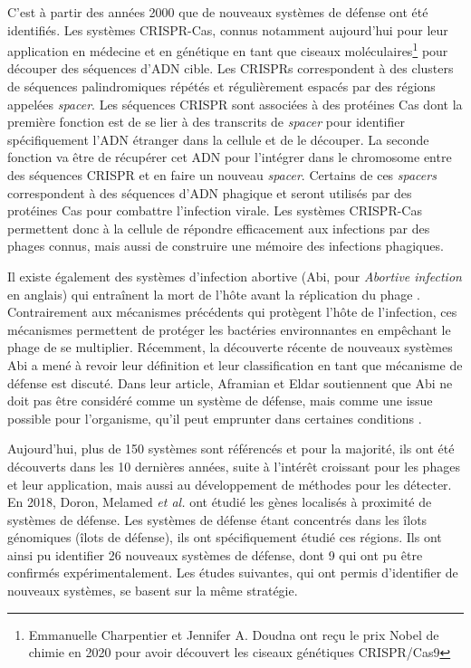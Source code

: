 C'est à partir des années 2000 que de nouveaux systèmes de défense ont été identifiés. Les systèmes CRISPR-Cas, connus notamment aujourd'hui pour leur application en médecine et en génétique en tant que ciseaux moléculaires\cite{haft_guild_2005,barrangou_crispr_2007}\footnote{Emmanuelle Charpentier et Jennifer A. Doudna ont reçu le prix Nobel de chimie en 2020 pour avoir découvert les ciseaux génétiques CRISPR/Cas9} pour découper des séquences d'ADN cible. Les CRISPRs correspondent à des clusters de séquences palindromiques répétés et régulièrement espacés par des régions appelées \textit{spacer}. Les séquences CRISPR sont associées à des protéines Cas dont la première fonction est de se lier à des transcrits de \textit{spacer} pour identifier spécifiquement l'ADN étranger dans la cellule et de le découper. La seconde fonction va être de récupérer cet ADN pour l'intégrer dans le chromosome entre des séquences CRISPR et en faire un nouveau \textit{spacer}. Certains de ces \textit{spacers} correspondent à des séquences d'ADN phagique et seront utilisés par des protéines Cas pour combattre l'infection virale. Les systèmes CRISPR-Cas permettent donc à la cellule de répondre efficacement aux infections par des phages connus, mais aussi de construire une mémoire des infections phagiques.

Il existe également des systèmes d'infection abortive (Abi, pour \textit{Abortive infection} en anglais) qui entraînent la mort de l'hôte avant la réplication du phage \cite{molineux_host-parasite_1991}. Contrairement aux mécanismes précédents qui protègent l'hôte de l'infection, ces mécanismes permettent de protéger les bactéries environnantes en empêchant le phage de se multiplier. Récemment, la découverte récente de nouveaux systèmes Abi a mené à revoir leur définition et leur classification en tant que mécanisme de défense est discuté. Dans leur article, Aframian et Eldar soutiennent que Abi ne doit pas être considéré comme un système de défense, mais comme une issue possible pour l'organisme, qu'il peut emprunter dans certaines conditions \cite{aframian_abortive_2023}.

Aujourd'hui, plus de 150 systèmes sont référencés et pour la majorité, ils ont été découverts dans les 10 dernières années, suite à l'intérêt croissant pour les phages et leur application, mais aussi au développement de méthodes pour les détecter. En 2018, Doron, Melamed \textit{et al.} \cite{doron_systematic_2018} ont étudié les gènes localisés à proximité de systèmes de défense. Les systèmes de défense étant concentrés dans les îlots génomiques (îlots de défense)\cite{makarova_defense_2011}, ils ont spécifiquement étudié ces régions. Ils ont ainsi pu identifier 26 nouveaux systèmes de défense, dont 9 qui ont pu être confirmés expérimentalement. Les études suivantes, qui ont permis d'identifier de nouveaux systèmes, se basent sur la même stratégie.

